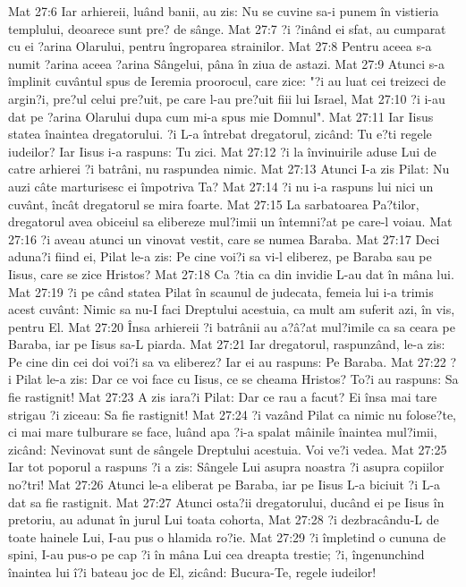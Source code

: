 Mat 27:6  Iar arhiereii, luând banii, au zis: Nu se cuvine sa-i punem în vistieria templului, deoarece sunt pre? de sânge.
Mat 27:7  ?i ?inând ei sfat, au cumparat cu ei ?arina Olarului, pentru îngroparea strainilor.
Mat 27:8  Pentru aceea s-a numit ?arina aceea ?arina Sângelui, pâna în ziua de astazi.
Mat 27:9  Atunci s-a împlinit cuvântul spus de Ieremia proorocul, care zice: "?i au luat cei treizeci de argin?i, pre?ul celui pre?uit, pe care l-au pre?uit fiii lui Israel,
Mat 27:10  ?i i-au dat pe ?arina Olarului dupa cum mi-a spus mie Domnul".
Mat 27:11  Iar Iisus statea înaintea dregatorului. ?i L-a întrebat dregatorul, zicând: Tu e?ti regele iudeilor? Iar Iisus i-a raspuns: Tu zici.
Mat 27:12  ?i la învinuirile aduse Lui de catre arhierei ?i batrâni, nu raspundea nimic.
Mat 27:13  Atunci I-a zis Pilat: Nu auzi câte marturisesc ei împotriva Ta?
Mat 27:14  ?i nu i-a raspuns lui nici un cuvânt, încât dregatorul se mira foarte.
Mat 27:15  La sarbatoarea Pa?tilor, dregatorul avea obiceiul sa elibereze mul?imii un întemni?at pe care-l voiau.
Mat 27:16  ?i aveau atunci un vinovat vestit, care se numea Baraba.
Mat 27:17  Deci aduna?i fiind ei, Pilat le-a zis: Pe cine voi?i sa vi-l eliberez, pe Baraba sau pe Iisus, care se zice Hristos?
Mat 27:18  Ca ?tia ca din invidie L-au dat în mâna lui.
Mat 27:19  ?i pe când statea Pilat în scaunul de judecata, femeia lui i-a trimis acest cuvânt: Nimic sa nu-I faci Dreptului acestuia, ca mult am suferit azi, în vis, pentru El.
Mat 27:20  Însa arhiereii ?i batrânii au a?â?at mul?imile ca sa ceara pe Baraba, iar pe Iisus sa-L piarda.
Mat 27:21  Iar dregatorul, raspunzând, le-a zis: Pe cine din cei doi voi?i sa va eliberez? Iar ei au raspuns: Pe Baraba.
Mat 27:22  ?i Pilat le-a zis: Dar ce voi face cu Iisus, ce se cheama Hristos? To?i au raspuns: Sa fie rastignit!
Mat 27:23  A zis iara?i Pilat: Dar ce rau a facut? Ei însa mai tare strigau ?i ziceau: Sa fie rastignit!
Mat 27:24  ?i vazând Pilat ca nimic nu folose?te, ci mai mare tulburare se face, luând apa ?i-a spalat mâinile înaintea mul?imii, zicând: Nevinovat sunt de sângele Dreptului acestuia. Voi ve?i vedea.
Mat 27:25  Iar tot poporul a raspuns ?i a zis: Sângele Lui asupra noastra ?i asupra copiilor no?tri!
Mat 27:26  Atunci le-a eliberat pe Baraba, iar pe Iisus L-a biciuit ?i L-a dat sa fie rastignit.
Mat 27:27  Atunci osta?ii dregatorului, ducând ei pe Iisus în pretoriu, au adunat în jurul Lui toata cohorta,
Mat 27:28  ?i dezbracându-L de toate hainele Lui, I-au pus o hlamida ro?ie.
Mat 27:29  ?i împletind o cununa de spini, I-au pus-o pe cap ?i în mâna Lui cea dreapta trestie; ?i, îngenunchind înaintea lui î?i bateau joc de El, zicând: Bucura-Te, regele iudeilor!
